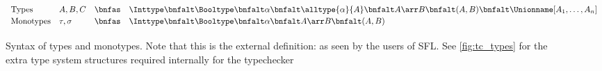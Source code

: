 \begin{figure}[h]
  \centering
  \[
      \begin{array}{llcl}
      \text{Types} & A, B, C & \bnfas &
            \Inttype \bnfalt \Booltype \bnfalt \alpha \bnfalt 
            \alltype{\alpha}{A} \bnfalt A \arr B \bnfalt
            (A, B) \bnfalt
            \Unionname[A_1, \dots, A_n]
      \\[2pt]
      \text{Monotypes} & \tau,\sigma & \bnfas &
            \Inttype \bnfalt \Booltype \bnfalt \alpha \bnfalt 
            A \arr B \bnfalt (A, B)
        \\[2pt]
      \end{array}
  \]
  
  \captionsetup{justification=centering}\caption{Syntax of types and monotypes. Note that this is the external definition: as seen by the users of SFL. See \ref{fig:tc_types} for the extra type system structures required internally for the typechecker}
\end{figure}